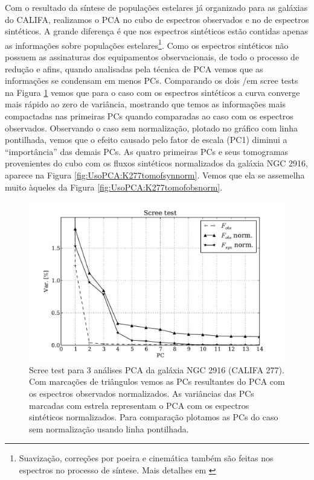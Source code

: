 Com o resultado da síntese de populações estelares já organizado para as galáxias do CALIFA, realizamos o PCA no cubo de
espectros observados e no de espectros sintéticos. A grande diferença é que nos espectros sintéticos estão contidas
apenas as informações sobre populações estelares\footnote{Suavização, correções por poeira e cinemática também são
feitas nos espectros no processo de síntese. Mais detalhes em \citet{CidFernandes2005}}. Como os espectros sintéticos
não possuem as assinaturas dos equipamentos observacionais, de todo o processo de redução e afins, quando analisadas
pela técnica de PCA vemos que as informações se condensam em menos PCs. Comparando os dois {/em scree tests} na Figura
\ref{fig:UsoPCA:K0277scree} vemos que para o caso com os espectros sintéticos a curva converge mais rápido ao zero de
variância, mostrando que temos as informações mais compactadas nas primeiras PCs quando comparadas ao caso com os
espectros observados. Observando o caso sem normalização, plotado no gráfico com linha pontilhada, vemos que o efeito
causado pelo fator de escala (PC1) diminui a ``importância'' das demais PCs. As quatro primeiras PCs e seus tomogramas
provenientes do cubo com os fluxos sintéticos normalizados da galáxia NGC 2916, aparece na Figura
\ref{fig:UsoPCA:K277tomofsynnorm}. Vemos que ela se assemelha muito àqueles da Figura \ref{fig:UsoPCA:K277tomofobsnorm}.

\begin{figure}
    \includegraphics[width=1.\textwidth]{figuras/K0277-screetest.pdf}
    \caption[Scree test comparativo entre 3 PCAs.]
    {Scree test para 3 análises PCA da galáxia NGC 2916 (CALIFA 277). Com marcações de triângulos vemos as PCs
    resultantes do PCA com os espectros observados normalizados. As variâncias das PCs marcadas com estrela representam
    o PCA com os espectros sintéticos normalizados. Para comparação plotamos as PCs do caso sem normalização usando
    linha pontilhada.}
    \label{fig:UsoPCA:K0277scree}
\end{figure}


